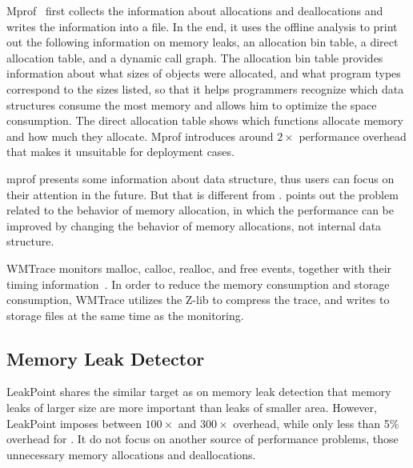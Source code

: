 Mprof~\cite{Zorn:1988:MAP:894814} first collects the information about allocations and deallocations and writes the information into a file. In the end, it uses the offline analysis to print out the following information on memory leaks, an allocation bin table, a direct allocation table, and a dynamic
call graph. The allocation bin table provides information about what sizes of objects were allocated, and what program types correspond to the sizes listed, so that it helps programmers recognize which data structures consume the most memory and allows him to optimize the space consumption. 
The direct allocation table shows which functions allocate memory and how much they allocate. Mprof introduces around $2\times$ performance overhead that makes it unsuitable for deployment cases. 


mprof presents some information about data structure, thus users can focus on their attention in the future. But that is different from \HeapPerf{}. \HeapPerf{} points out the problem related to the behavior of memory allocation, in which the performance can be improved by changing the behavior of memory allocations, not internal data structure. 
  


\cite{846583}

\cite{1190248}



WMTrace monitors malloc, calloc, realloc, and free events, together with their timing information~\cite{Perks:2011:WAP:2186355.2186369}. In order to reduce the memory consumption and storage consumption, WMTrace{} utilizes the Z-lib to compress the trace, and writes to storage files at the same time as the monitoring. 
 

\subsection{Memory Leak Detector}

LeakPoint\cite{Clause:2010:LPC:1806799.1806874} shares the similar target as \HeapPerf{} on memory leak detection that memory leaks of larger size
are more important than leaks of smaller area. However, LeakPoint imposes between $100\times$ and $300\times$ overhead, while only less than 5\% overhead for \HeapPerf{}. It do not focus on another source of performance problems, those unnecessary memory allocations and deallocations. 

